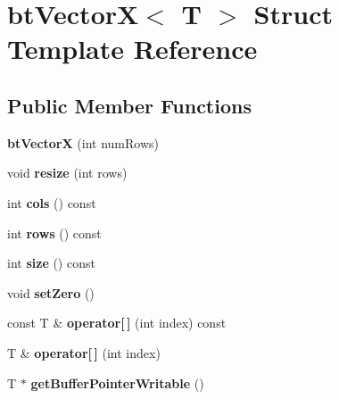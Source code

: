 \hypertarget{structbtVectorX}{}\section{bt\+VectorX$<$ T $>$ Struct Template Reference}
\label{structbtVectorX}
\subsection*{Public Member Functions}
\begin{DoxyCompactItemize}
\item 
\mbox{\label{structbtVectorX_a5919baf0daf9dca9c1821ad33b6e2eb3}} 
{\bfseries bt\+VectorX} (int num\+Rows)
\item 
\mbox{\label{structbtVectorX_a604e385e856a599fc2126a7804cfa856}} 
void {\bfseries resize} (int rows)
\item 
\mbox{\label{structbtVectorX_ab14c5901eb1772963afecbc538d2d018}} 
int {\bfseries cols} () const
\item 
\mbox{\label{structbtVectorX_a9b0a99c060ce90414fd62daf2499ec22}} 
int {\bfseries rows} () const
\item 
\mbox{\label{structbtVectorX_a3905bfcb185adf8e7e73fe611864b6e0}} 
int {\bfseries size} () const
\item 
\mbox{\label{structbtVectorX_adcc796091625d29f1e5ebef76753846f}} 
void {\bfseries set\+Zero} ()
\item 
\mbox{\label{structbtVectorX_a921a3b39b3dc135e4ef9dfaf26b25084}} 
const T \& {\bfseries operator\mbox{[}$\,$\mbox{]}} (int index) const
\item 
\mbox{\label{structbtVectorX_a5b6c10204cdcb48c4124243b979c4dcb}} 
T \& {\bfseries operator\mbox{[}$\,$\mbox{]}} (int index)
\item 
\mbox{\label{structbtVectorX_aea4bc1aaef22a96a1090435a7d026b0c}} 
T $\ast$ {\bfseries get\+Buffer\+Pointer\+Writable} ()
\item 

\end{DoxyCompactItemize}

